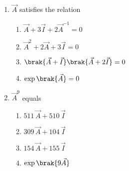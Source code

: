 \begin{enumerate}
\item  $\vec{A}$ satisfies the relation
\begin{multicols}{2}
\begin{enumerate}
    \item  $\vec{A} + 3\vec{I} + 2\vec{A}^{-1} = 0$ 
 \item  $\vec{A}^2 + 2\vec{A} + 3\vec{I} = 0$
 \item  $\brak{\vec{A} + \vec{I}}\brak{\vec{A} + 2\vec{I}} = 0$ 
 \item  $\exp\brak{\vec{A}} = 0$ 
\end{enumerate}
\end{multicols}
%
\item  $\vec{A}^9$ equals
\begin{multicols}{4}
\begin{enumerate}
\item $511\, \vec{A} + 510\, \vec{I}$
\item $309\, \vec{A} + 104\, \vec{I}$
\item $154\, \vec{A} + 155\, \vec{I}$
\item $\exp\brak{9\vec{A}}$ 
\end{enumerate}
\end{multicols}
\end{enumerate}

